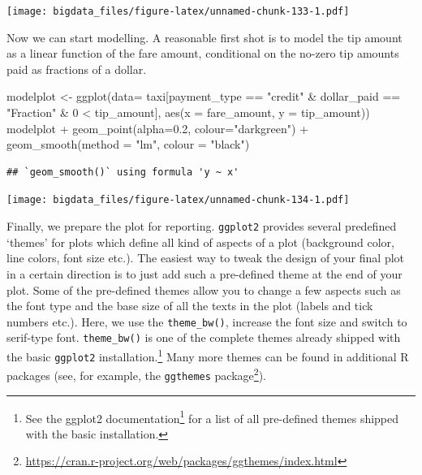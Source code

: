 \documentclass[
  12pt,
]{style/krantz}
\newenvironment{Shaded}{\begin{snugshade}}{\end{snugshade}}
\newcommand{\AttributeTok}[1]{\textcolor[rgb]{0.77,0.63,0.00}{#1}}
\newcommand{\DecValTok}[1]{\textcolor[rgb]{0.00,0.00,0.81}{#1}}
\newcommand{\FloatTok}[1]{\textcolor[rgb]{0.00,0.00,0.81}{#1}}
\newcommand{\FunctionTok}[1]{\textcolor[rgb]{0.00,0.00,0.00}{#1}}
\newcommand{\NormalTok}[1]{#1}
\newcommand{\OtherTok}[1]{\textcolor[rgb]{0.56,0.35,0.01}{#1}}
\newcommand{\SpecialCharTok}[1]{\textcolor[rgb]{0.00,0.00,0.00}{#1}}
\newcommand{\StringTok}[1]{\textcolor[rgb]{0.31,0.60,0.02}{#1}}
\renewcommand{\href}[2]{#2\footnote{\url{#1}}}
\begin{document}
\texttt{[image: bigdata\_files/figure-latex/unnamed-chunk-133-1.pdf]}

Now we can start modelling. A reasonable first shot is to model the tip amount as a linear function of the fare amount, conditional on the no-zero tip amounts paid as fractions of a dollar.

\begin{Shaded}
\begin{Highlighting}[]
\NormalTok{modelplot }\OtherTok{\textless{}{-}} \FunctionTok{ggplot}\NormalTok{(}\AttributeTok{data=}\NormalTok{ taxi[payment\_type }\SpecialCharTok{==} \StringTok{"credit"} \SpecialCharTok{\&}\NormalTok{ dollar\_paid }\SpecialCharTok{==} \StringTok{"Fraction"} \SpecialCharTok{\&} \DecValTok{0} \SpecialCharTok{\textless{}}\NormalTok{ tip\_amount],}
                    \FunctionTok{aes}\NormalTok{(}\AttributeTok{x =}\NormalTok{ fare\_amount, }\AttributeTok{y =}\NormalTok{ tip\_amount))}
\NormalTok{modelplot }\SpecialCharTok{+}
     \FunctionTok{geom\_point}\NormalTok{(}\AttributeTok{alpha=}\FloatTok{0.2}\NormalTok{, }\AttributeTok{colour=}\StringTok{"darkgreen"}\NormalTok{) }\SpecialCharTok{+}
     \FunctionTok{geom\_smooth}\NormalTok{(}\AttributeTok{method =} \StringTok{"lm"}\NormalTok{, }\AttributeTok{colour =} \StringTok{"black"}\NormalTok{)}
\end{Highlighting}
\end{Shaded}

\begin{verbatim}
## `geom_smooth()` using formula 'y ~ x'
\end{verbatim}

\texttt{[image: bigdata\_files/figure-latex/unnamed-chunk-134-1.pdf]}

Finally, we prepare the plot for reporting. \texttt{ggplot2} provides several predefined `themes' for plots which define all kind of aspects of a plot (background color, line colors, font size etc.). The easiest way to tweak the design of your final plot in a certain direction is to just add such a pre-defined theme at the end of your plot. Some of the pre-defined themes allow you to change a few aspects such as the font type and the base size of all the texts in the plot (labels and tick numbers etc.). Here, we use the \texttt{theme\_bw()}, increase the font size and switch to serif-type font. \texttt{theme\_bw()} is one of the complete themes already shipped with the basic \texttt{ggplot2} installation.\footnote{See \href{https://ggplot2.tidyverse.org/reference/ggtheme.html}{the ggplot2 documentation} for a list of all pre-defined themes shipped with the basic installation.} Many more themes can be found in additional R packages (see, for example, the \href{https://cran.r-project.org/web/packages/ggthemes/index.html}{\texttt{ggthemes} package}).
\end{document}
